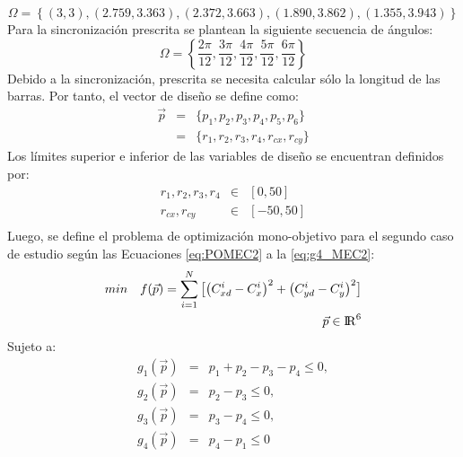 \begin{equation}\label{eq:Puntos de Presicion MEC2}
\Omega = \left \{ (3, 3), (2.759, 3.363), (2.372, 3.663), (1.890, 3.862), (1.355, 3.943)\right\} 
\end{equation}
Para la sincronización prescrita se plantean la siguiente secuencia de ángulos:
\begin{equation}\label{eq:Angulos MEC2}
\Omega = \left \{ \frac{2\pi}{12},\frac{3\pi}{12},\frac{4\pi}{12},\frac{5\pi}{12},\frac{6\pi}{12}\right\} 
\end{equation}
Debido a la sincronización, prescrita se necesita calcular sólo la longitud de las barras. Por tanto, el vector de diseño se define como:
\begin{eqnarray}\label{eq:Vector variables MEC1}
\vec{p} &=& \{p_1,p_2,p_3,p_{4},p_{5},p_{6} \}\\
       &=& \{ r_1,r_2,r_3,r_4,r_{cx},r_{cy} \} 
\end{eqnarray}
Los límites superior e inferior de las variables de diseño se encuentran definidos
por:
\begin{eqnarray}\label{eq:limites variables MEC1}
r_1,r_2,r_3,r_4& \in & \left[ 0,50\right] \\
r_{cx},r_{cy} & \in & \left[ -50,50\right] \\
\end{eqnarray}
Luego, se define el problema de optimización mono-objetivo para el segundo caso de estudio según las Ecuaciones \ref{eq:POMEC2} a la \ref{eq:g4_MEC2}:
\begin{equation}\label{eq:POMEC2}
 \begin{aligned}
min\quad  f(\vec{p})=
\sum_{i=1}^{N}\big[\big(C^{i}_{xd}-C^{i}_{x} \big)^2 +\big(C^{i}_{yd}-C^{i}_{y} \big)^2\big]
\\
\vec{p} \in  {\rm I\!R}^{6}
\\
\end{aligned}
\end{equation}
Sujeto a:
\begin{eqnarray}\label{eq:Restricciones MEC2}
g_{1}(\vec{p})&=&p_{1}+ p_{2}-p_{3}-p_{4} \leq 0,\\
g_{2}(\vec{p})&=&p_{2}-p_{3} \leq 0,\\
g_{3}(\vec{p})&=&p_{3}-p_{4} \leq 0,\\
g_{4}(\vec{p})&=&p_{4}-p_{1} \leq 0 \label{eq:g4_MEC2}
\end{eqnarray}


